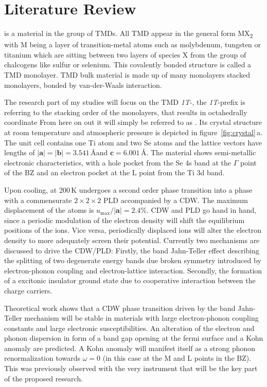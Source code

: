 \section{\ts Literature Review}
\ts\space is a material in the group of \acp{TMD}.
All \ac{TMD} appear in the general form MX\textsubscript{2} with M being a layer of transition-metal atoms such as molybdenum, tungsten or titanium which are sitting between two layers of species X from the group of chalcogens like sulfur or selenium.
This covalently bonded structure is called a \ac{TMD} monolayer.
\Ac{TMD} bulk material is made up of many monolayers stacked monolayers, bonded by van-der-Waals interaction.

The research part of my studies will focus on the \ac{TMD} \textit{1T}-\ts, the \textit{1T}-prefix is referring to the stacking order of the monolayers, that results in octahedrally coordinate
From here on out it will simply be referred to as \ts.
Its crystal structure at room temperature and atmospheric pressure is depicted in figure~\ref{fig:crystal}\,a.
The unit cell contains one Ti atom and two Se atoms and the lattice vectors have lengths of $|\mathbf{a}|=|\mathbf{b}|=3.541$\,\AA\space and $\mathbf{c}=6.001$\,\AA\cite{patel1983}.
The material shows semi-metallic electronic characteristics\cite{bachrach1976}, with a hole pocket from the Se 4s band at the $\Gamma$ point of the \ac{BZ} and an electron pocket at the L point from the Ti 3d band\cite{zunger1978}.

Upon cooling, at 200\,K \cite{disalvo1976} \ts\space undergoes a second order phase transition into a phase with a commensurate $2\times2\times2$ \ac{PLD} accompanied by a \ac{CDW}\cite{rossnagel2011}.
The maximum displacement of the atoms is $u_\mathrm{max}/|\mathbf{a}|=2.4\%$\cite{disalvo1976}.
\ac{CDW} and \ac{PLD} go hand in hand, since a periodic modulation of the electron density will shift the equilibrium positions of the ions.
Vice versa, periodically displaced ions will alter the electron density to more adequately screen their potential.
Currently two mechanisms are discussed to drive the \ac{CDW}/\ac{PLD}: 
Firstly, the band Jahn-Teller effect describing the splitting of two degenerate energy bands due broken symmetry introduced by electron-phonon coupling and electron-lattice interaction\cite{JT}.
Secondly, the formation of a excitonic insulator ground state due to cooperative interaction between the charge carriers\cite{EI}.

Theoretical work shows that a \ac{CDW} phase transition driven by the band Jahn-Teller mechanism will be stable in materials with large electron-phonon coupling constants and large electronic susceptibilities\cite{friend1979}.
An alteration of the electron and phonon dispersion in form of a band gap opening at the fermi surface and a Kohn anomaly are predicted.
A Kohn anomaly will manifest itself as a strong phonon renormalization towards $\omega=0$\cite{kohn1959} (in this case at the M and L points in the \ac{BZ}).
This was previously observed with the very instrument that will be the key part of the proposed research\cite{otto2021}.

